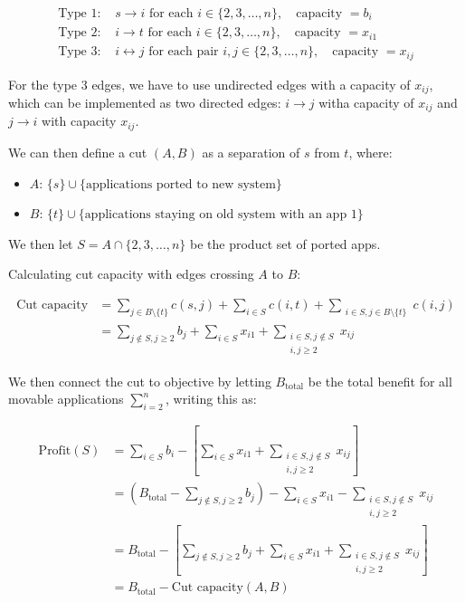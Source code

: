 \documentclass[
]{article}
\providecommand{\tightlist}{%
  \setlength{\itemsep}{0pt}\setlength{\parskip}{0pt}}
\begin{document}
\[
\begin{align} \text{Type 1: } & s \to i \text{ for each } i \in \{2, 3, \dots, n\}, \quad \text{capacity } = b_i \\
 \text{Type 2: } & i \to t \text{ for each } i \in \{2, 3, \dots, n\}, \quad \text{capacity } = x_{i1} \\
 \text{Type 3: } & i \leftrightarrow j \text{ for each pair } i, j \in \{2, 3, \dots, n\}, \quad \text{capacity } = x_{ij} \end{align}
\]

For the type 3 edges, we have to use undirected edges with a capacity of
\(x_{ij}\), which can be implemented as two directed edges: \(i\to j\)
witha capacity of \(x_{ij}\) and \(j\to i\) with capacity \(x_{ij}\).

We can then define a cut \((A,B)\) as a separation of \(s\) from \(t\),
where:

\begin{itemize}
\tightlist
\item
  \(A\): \(\{ s \} \cup \{ \text{applications ported to new system} \}\)
\item
  \(B\):
  \(\{ t \} \cup \{ \text{applications staying on old system with an app 1} \}\)
\end{itemize}

We then let \(S=A \cap \{ 2,3,\dots,n \}\) be the product set of ported
apps.

Calculating cut capacity with edges crossing \(A\) to \(B\):

\[
\begin{align} \text{Cut capacity} &= \sum_{j \in B \setminus \{t\}} c(s, j) + \sum_{i \in S} c(i, t) + \sum_{\substack{i \in S, j \in B \setminus \{t\}}} c(i, j) \\
 &= \sum_{j \notin S, j \geq 2} b_j + \sum_{i \in S} x_{i1} + \sum_{\substack{i \in S, j \notin S \\
 i,j \geq 2}} x_{ij} \end{align}
\]

We then connect the cut to objective by letting \(B_{\text{total}}\) be
the total benefit for all movable applications \(\sum_{i=2}^n\), writing
this as:

\[
\begin{align} \text{Profit}(S) &= \sum_{i \in S} b_i - \left[\sum_{i \in S} x_{i1} + \sum_{\substack{i \in S, j \notin S \\ i,j \geq 2}} x_{ij}\right] \\
 &= \left(B_{\text{total}} - \sum_{j \notin S, j \geq 2} b_j\right) - \sum_{i \in S} x_{i1} - \sum_{\substack{i \in S, j \notin S \\ i,j \geq 2}} x_{ij} \\
 &= B_{\text{total}} - \left[\sum_{j \notin S, j \geq 2} b_j + \sum_{i \in S} x_{i1} + \sum_{\substack{i \in S, j \notin S \\ i,j \geq 2}} x_{ij}\right] \\ &= B_{\text{total}} - \text{Cut capacity}(A, B) \end{align}
\]
\end{document}
